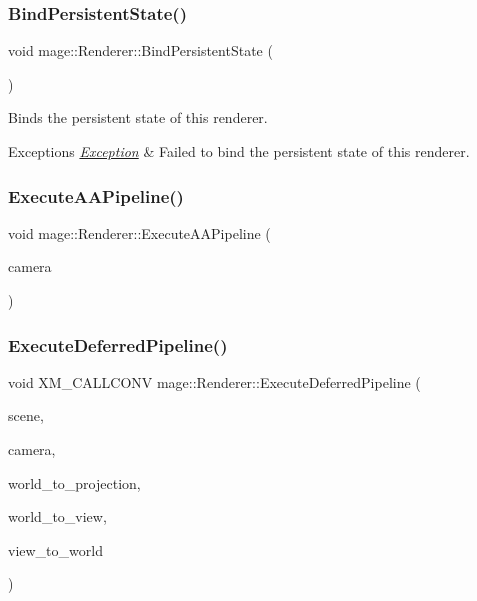 \subsubsection{\texorpdfstring{Bind\+Persistent\+State()}{BindPersistentState()}}
{\footnotesize\ttfamily void mage\+::\+Renderer\+::\+Bind\+Persistent\+State (\begin{DoxyParamCaption}{ }\end{DoxyParamCaption})}

Binds the persistent state of this renderer.


\begin{DoxyExceptions}{Exceptions}
{\em \hyperlink{classmage_1_1_exception}{Exception}} & Failed to bind the persistent state of this renderer. \\
\hline
\end{DoxyExceptions}
\hypertarget{classmage_1_1_renderer_a9ffd7b8c58e4647b38d864778d53d390}{}\label{classmage_1_1_renderer_a9ffd7b8c58e4647b38d864778d53d390} 
\subsubsection{\texorpdfstring{Execute\+A\+A\+Pipeline()}{ExecuteAAPipeline()}}
{\footnotesize\ttfamily void mage\+::\+Renderer\+::\+Execute\+A\+A\+Pipeline (\begin{DoxyParamCaption}\item[{const \hyperlink{classmage_1_1_camera}{Camera} \&}]{camera }\end{DoxyParamCaption})\hspace{0.3cm}{\ttfamily [private]}}

\hypertarget{classmage_1_1_renderer_a3fb91b8f8f0022e9e8381103c7e23427}{}\label{classmage_1_1_renderer_a3fb91b8f8f0022e9e8381103c7e23427} 
\subsubsection{\texorpdfstring{Execute\+Deferred\+Pipeline()}{ExecuteDeferredPipeline()}}
{\footnotesize\ttfamily void X\+M\+\_\+\+C\+A\+L\+L\+C\+O\+NV mage\+::\+Renderer\+::\+Execute\+Deferred\+Pipeline (\begin{DoxyParamCaption}\item[{const \hyperlink{classmage_1_1_scene}{Scene} \&}]{scene,  }\item[{const \hyperlink{classmage_1_1_camera}{Camera} \&}]{camera,  }\item[{F\+X\+M\+M\+A\+T\+R\+IX}]{world\+\_\+to\+\_\+projection,  }\item[{C\+X\+M\+M\+A\+T\+R\+IX}]{world\+\_\+to\+\_\+view,  }\item[{C\+X\+M\+M\+A\+T\+R\+IX}]{view\+\_\+to\+\_\+world }\end{DoxyParamCaption})\hspace{0.3cm}{\ttfamily [private]}}

